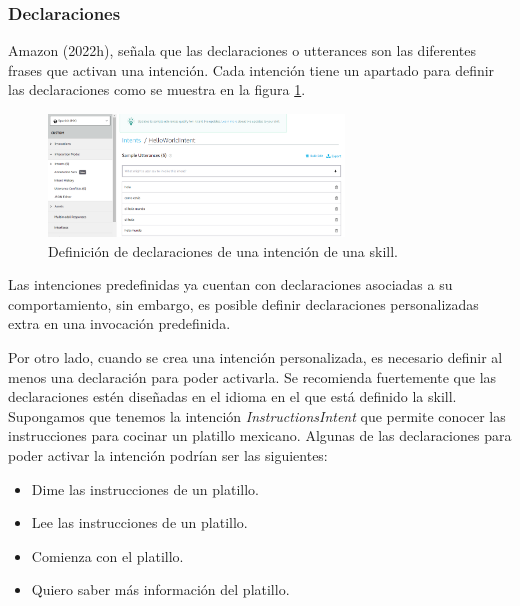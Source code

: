
\subsubsection{Declaraciones}
\label{DeclaracionescapIV}

Amazon (2022h), señala que las declaraciones o utterances son las diferentes frases que activan una intención. Cada intención tiene un apartado para definir las declaraciones como se muestra en la figura \ref{fig:47}.

\begin{figure}
  \centering
  \includegraphics[width=0.70\textwidth]{Cap4/Figuras/Declaraciones.png}
  \caption{Definición de declaraciones de una intención de una skill.}
  \label{fig:47}
\end{figure}

Las intenciones predefinidas ya cuentan con declaraciones asociadas a su comportamiento, sin embargo, es posible definir declaraciones personalizadas extra en una invocación predefinida.

Por otro lado, cuando se crea una intención personalizada, es necesario definir al menos una declaración para poder activarla. Se recomienda fuertemente que las declaraciones estén diseñadas en el idioma en el que está definido la skill. Supongamos que tenemos la intención \textit{InstructionsIntent} que permite conocer las instrucciones para cocinar un platillo mexicano. Algunas de las declaraciones para poder activar la intención podrían ser las siguientes:

\begin{itemize}
  \item Dime las instrucciones de un platillo.
  \item Lee las instrucciones de un platillo.
  \item Comienza con el platillo.
  \item Quiero saber más información del platillo.
\end{itemize}

